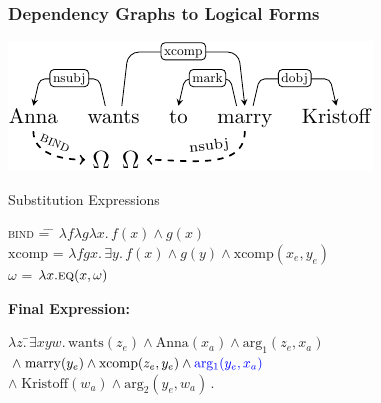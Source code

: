 \documentclass[mathserif,12pt]{beamer}
\renewcommand{\land}{\wedge}
\newcommand{\lspace}{.\,}
\begin{document}
\begin{frame}
\frametitle{Dependency Graphs to Logical Forms}
\centering
\includegraphics[trim=0em 0em 0em 0em,clip=true,scale=1.1]{figures/control-obj-extraction-bind-crop}

\begin{block}{Substitution Expressions}
\begin{tabbing}
\textsc{bind} \hspace{1em} \=  = \hspace{1em} \= $\lambda f \lambda g \lambda x \lspace f(x) \land g(x)$ \\
$\mathrm{xcomp}$ \> = \hspace{1em} \> $\lambda f g x \lspace \exists y \lspace f(x) \wedge g(y) \wedge \mathrm{xcomp}(x_e, y_e)$ \\
$\omega $ \> = \> $\lambda x. \textsc{eq}(x, \omega)$ 
\end{tabbing}
\end{block}

\vspace{1em}

\raggedright \textbf{Final Expression:}
\begin{tabbing}
$\lambda z\lspace$\=$\exists xyw\lspace \mathrm{wants}(z_e) \wedge \mathrm{Anna}(x_a) \wedge \mathrm{arg_1}(z_e, x_a) $ \\
\> $ \wedge\; \mathrm{marry}(y_e) \wedge \mathrm{xcomp}(z_e, y_e) \wedge {\color{blue}\mathrm{arg_1}(y_e, x_a)}$\\
\> $ \wedge\; \mathrm{Kristoff}(w_a)  \wedge \mathrm{arg_2}(y_e, w_a)$\,.
\end{tabbing}

\end{frame} 
\end{document}
